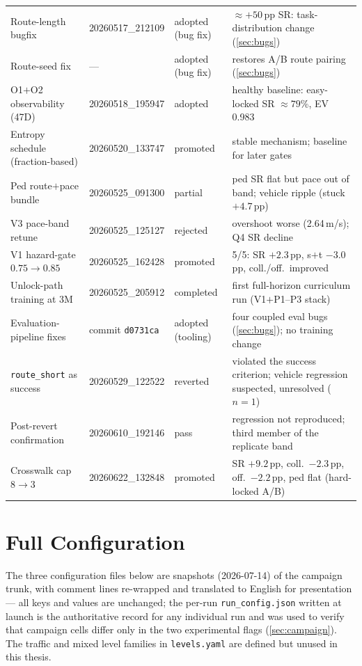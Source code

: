 \begin{small}
\begin{longtable}{@{}p{3.1cm}p{2.8cm}p{2.0cm}p{5.6cm}@{}}
  Route-length bugfix & 20260517\_212109 & adopted (bug fix) & $\approx +50$\,pp SR: task-distribution change (\cref{sec:bugs}) \\
  Route-seed fix & --- & adopted (bug fix) & restores A/B route pairing (\cref{sec:bugs}) \\
  O1$+$O2 observability (47D) & 20260518\_195947 & adopted & healthy baseline: easy-locked SR $\approx 79$\%, EV 0.983 \\
  Entropy schedule (fraction-based) & 20260520\_133747 & promoted & stable mechanism; baseline for later gates \\
  Ped route$+$pace bundle & 20260525\_091300 & partial & ped SR flat but pace out of band; vehicle ripple (stuck $+4.7$\,pp) \\
  V3 pace-band retune & 20260525\_125127 & rejected & overshoot worse (2.64\,m/s); Q4 SR decline \\
  V1 hazard-gate $0.75 \to 0.85$ & 20260525\_162428 & promoted & 5/5: SR $+2.3$\,pp, s$+$t $-3.0$\,pp, coll./off.\ improved \\
  Unlock-path training at 3M & 20260525\_205912 & completed & first full-horizon curriculum run (V1$+$P1--P3 stack) \\
  Evaluation-pipeline fixes & commit \texttt{d0731ca} & adopted (tooling) & four coupled eval bugs (\cref{sec:bugs}); no training change \\
  \texttt{route\_short} as success & 20260529\_122522 & reverted & violated the success criterion; vehicle regression suspected, unresolved ($n=1$) \\
  Post-revert confirmation & 20260610\_192146 & pass & regression not reproduced; third member of the replicate band \\
  Crosswalk cap $8 \to 3$ & 20260622\_132848 & promoted & SR $+9.2$\,pp, coll.\ $-2.3$\,pp, off.\ $-2.2$\,pp, ped flat (hard-locked A/B) \\
  \bottomrule
\end{longtable}
\end{small}

\chapter{Full Configuration}
\label{app:hyperparams}

The three configuration files below are snapshots (2026-07-14) of the
campaign trunk, with comment lines re-wrapped and translated to English
for presentation --- all keys and values are unchanged; the per-run \texttt{run\_config.json} written at
launch is the authoritative record for any individual run and was used to
verify that campaign cells differ only in the two experimental flags
(\cref{sec:campaign}). The traffic and mixed level families in
\texttt{levels.yaml} are defined but unused in this thesis.

